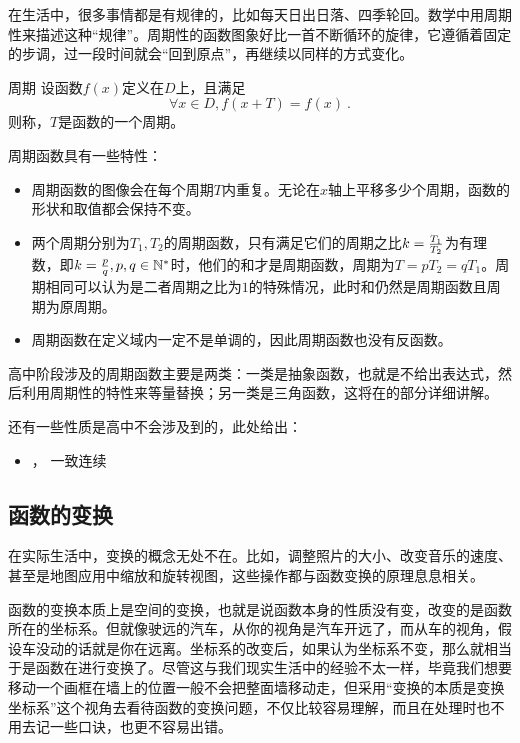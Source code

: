 在生活中，很多事情都是有规律的，比如每天日出日落、四季轮回。数学中用周期性来描述这种“规律”。周期性的函数图象好比一首不断循环的旋律，它遵循着固定的步调，过一段时间就会“回到原点”，再继续以同样的方式变化。

\begin{definition}{周期}
设函数$f(x)$定义在$D$上，且满足
\begin{equation}
\forall x\in D,f(x+T)=f(x)~.
\end{equation}
则称，$T$是函数的一个周期。
\end{definition}


周期函数具有一些特性：
\begin{itemize}
\item 周期函数的图像会在每个周期$T$内重复。无论在$x$轴上平移多少个周期，函数的形状和取值都会保持不变。
\item 两个周期分别为$T_1,T_2$的周期函数，只有满足它们的周期之比$k={T_1\over T_2}$为有理数，即$k={p\over q},p,q\in\mathbb{N}^*$时，他们的和才是周期函数，周期为$T=pT_2=qT_1$。周期相同可以认为是二者周期之比为$1$的特殊情况，此时和仍然是周期函数且周期为原周期。
\item 周期函数在定义域内一定不是单调的，因此周期函数也没有反函数。
\end{itemize}

高中阶段涉及的周期函数主要是两类：一类是抽象函数，也就是不给出表达式，然后利用周期性的特性来等量替换；另一类是三角函数，这将在的部分详细讲解。



还有一些性质是高中不会涉及到的，此处给出：
\begin{itemize}
\item {}， 一致连续
\end{itemize}

\subsection{函数的变换}

在实际生活中，变换的概念无处不在。比如，调整照片的大小、改变音乐的速度、甚至是地图应用中缩放和旋转视图，这些操作都与函数变换的原理息息相关。

函数的变换本质上是空间的变换，也就是说函数本身的性质没有变，改变的是函数所在的坐标系。但就像驶远的汽车，从你的视角是汽车开远了，而从车的视角，假设车没动的话就是你在远离。坐标系的改变后，如果认为坐标系不变，那么就相当于是函数在进行变换了。尽管这与我们现实生活中的经验不太一样，毕竟我们想要移动一个画框在墙上的位置一般不会把整面墙移动走，但采用“变换的本质是变换坐标系”这个视角去看待函数的变换问题，不仅比较容易理解，而且在处理时也不用去记一些口诀，也更不容易出错。


